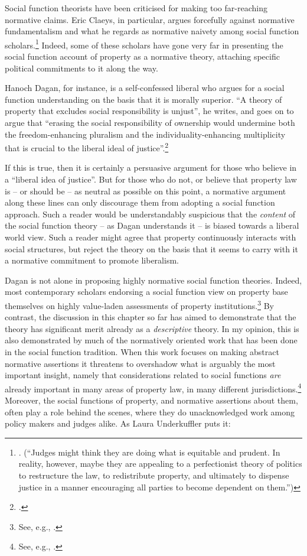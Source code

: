 Social function theorists have been criticised for making too far-reaching normative claims. Eric Claeys, in particular, argues forcefully against normative fundamentalism and what he regards as normative naivety among social function scholars.\footnote{\cite[945]{claeys09}. (``Judges might think they are doing what is equitable and prudent. In reality, however, maybe they are appealing to a perfectionist theory of politics to restructure the law, to redistribute property, and ultimately to dispense justice in a manner encouraging all parties to become dependent on them.'')} Indeed, some of these scholars have gone very far in presenting the social function account of property as a normative theory, attaching specific political commitments to it along the way.

Hanoch Dagan, for instance, is a self-confessed liberal who argues for a social function understanding on the basis that it is morally superior. ``A theory of property that excludes social responsibility is unjust'', he writes, and goes on to argue that ``erasing the social responsibility of ownership would undermine both the freedom-enhancing pluralism and the individuality-enhancing multiplicity that is crucial to the liberal ideal of justice''.\footcite[1259]{dagan07}

If this is true, then it is certainly a persuasive argument for those who believe in a ``liberal idea of justice''. But for those who do not, or believe that property law is -- or should be -- as neutral as possible on this point, a normative argument along these lines can only discourage them from adopting a social function approach. Such a reader would be understandably suspicious that the {\it content} of the social function theory -- as Dagan understands it -- is biased towards a liberal world view. Such a reader might agree that property continuously interacts with social structures, but reject the theory on the basis that it seems to carry with it a normative commitment to promote liberalism.

Dagan is not alone in proposing highly normative social function theories. Indeed, most contemporary scholars endorsing a social function view on property base themselves on highly value-laden assessments of property institutions.\footnote{See, e.g.,  \cite{alexander09,crawford11,davidson11,singer09,penalver09}.} By contrast, the discussion in this chapter so far has aimed to demonstrate that the theory has significant merit already as a {\it descriptive} theory. In my opinion, this is also demonstrated by much of the normatively oriented work that has been done in the social function tradition. When this work focuses on making abstract normative assertions it threatens to overshadow what is arguably the most important insight, namely that considerations related to social functions {\it are} already important in many areas of property law, in many different jurisdictions.\footnote{See, e.g., \cite{gray94,mirow11,cunha11,bonilla11}.} Moreover, the social functions of property, and normative assertions about them, often play a role behind the scenes, where they do unacknowledged work among policy makers and judges alike. As Laura Underkuffler puts it:

